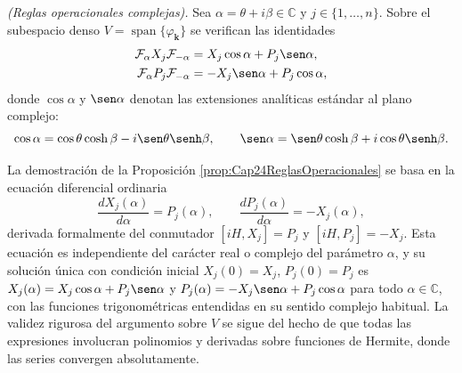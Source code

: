             \begin{proposition}\label{prop:Cap24ReglasComp}
                \textit{(Reglas operacionales complejas).} Sea $\alpha = \theta + i\beta \in \mathbb{C}$ y $j\in\{1,\ldots,n\}$. Sobre el subespacio denso $V = \operatorname{span}\{\varphi_{\boldsymbol{k}}\}$ se verifican las identidades
                \begin{align}
                    \mathcal{F}_\alpha X_j \mathcal{F}_{-\alpha} & = X_j \cos\alpha + P_j \sen\alpha, \label{eq:Cap24ReglaXComp} \\
                    \mathcal{F}_\alpha P_j \mathcal{F}_{-\alpha} & = -X_j \sen\alpha + P_j \cos\alpha, \label{eq:Cap24ReglaPComp}
                \end{align}
                donde $\cos\alpha$ y $\sen\alpha$ denotan las extensiones analíticas estándar al plano complejo:
                \begin{equation*}
                    \cos\alpha = \cos\theta\cosh\beta - i\sen\theta\senh\beta,\qquad \sen\alpha = \sen\theta\cosh\beta + i\cos\theta\senh\beta.
                \end{equation*}
            \end{proposition}
            \begin{Proof}
                La demostración de la Proposición \ref{prop:Cap24ReglasOperacionales} se basa en la ecuación diferencial ordinaria
                \begin{equation*}
                    \frac{dX_j(\alpha)}{d\alpha} = P_j(\alpha), \qquad \frac{dP_j(\alpha)}{d\alpha} = -X_j(\alpha),
                \end{equation*}
                derivada formalmente del conmutador $[iH, X_j] = P_j$ y $[iH, P_j] = -X_j$. Esta ecuación es independiente del carácter real o complejo del parámetro $\alpha$, y su solución única con condición inicial $X_j(0) = X_j$, $P_j(0) = P_j$ es $X_j(\alpha) = X_j\cos\alpha + P_j\sen\alpha$ y $P_j(\alpha) = -X_j\sen\alpha + P_j\cos\alpha$ para todo $\alpha \in \mathbb{C}$, con las funciones trigonométricas entendidas en su sentido complejo habitual. La validez rigurosa del argumento sobre $V$ se sigue del hecho de que todas las expresiones involucran polinomios y derivadas sobre funciones de Hermite, donde las series convergen absolutamente.
            \end{Proof}

